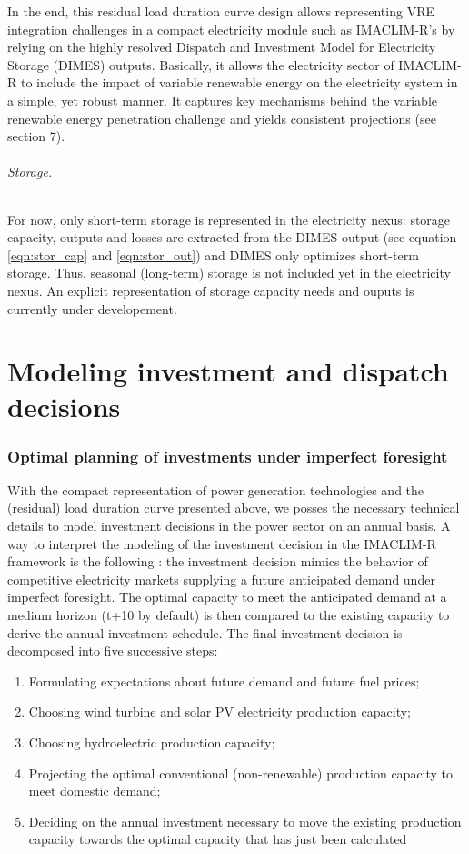 In the end, this residual load duration curve design allows representing VRE integration challenges in a compact electricity module such as IMACLIM-R's by relying on the highly resolved Dispatch and Investment Model for Electricity Storage (DIMES)  outputs. Basically, it allows the electricity sector of IMACLIM-R to include the impact of variable renewable energy on the electricity system in a simple, yet robust manner. It captures key mechanisms behind the variable renewable energy penetration challenge and yields consistent projections (see section 7).

\paragraph*{Storage.}
For now, only short-term storage is represented in the electricity nexus: storage capacity, outputs and losses are extracted from the DIMES output (see equation \ref{eqn:stor_cap} and \ref{eqn:stor_out}) and DIMES only optimizes short-term storage. Thus, seasonal (long-term) storage is not included yet in the electricity nexus. An explicit representation of storage capacity needs and ouputs is currently under developement.

\part*{Modeling investment and dispatch decisions}

\section{Optimal planning of investments under imperfect foresight}

With the compact representation of power generation technologies and the (residual) load duration curve presented above, we posses the necessary technical details to model investment decisions in the power sector on an annual basis.
A way to interpret the modeling of the investment decision in the IMACLIM-R framework is the following : the investment decision mimics the behavior of competitive electricity markets supplying a future anticipated demand under imperfect foresight. The optimal capacity to meet the anticipated demand at a medium horizon (t+10 by default) is then compared to the existing capacity to derive the annual investment schedule.
The final investment decision is decomposed into five successive steps:
\begin{enumerate}
    \item Formulating expectations about future demand and future fuel prices;
    \item Choosing  wind turbine and solar PV  electricity production capacity;
    \item Choosing hydroelectric production capacity;
    \item Projecting the optimal conventional (non-renewable) production capacity to meet domestic demand;
    \item Deciding on the annual investment necessary to move the existing production capacity towards the optimal capacity that has just been calculated
\end{enumerate}

